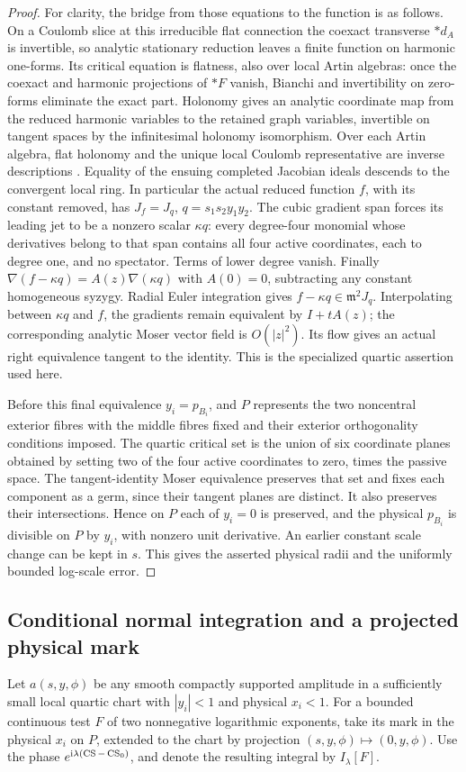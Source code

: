 \begin{proof}
For clarity, the bridge from those equations to the function is as follows. On a Coulomb slice at this irreducible flat connection the coexact transverse \(*d_A\) is invertible, so analytic stationary reduction leaves a finite function on harmonic one-forms. Its critical equation is flatness, also over local Artin algebras: once the coexact and harmonic projections of \(*F\) vanish, Bianchi and invertibility on zero-forms eliminate the exact part. Holonomy gives an analytic coordinate map from the reduced harmonic variables to the retained graph variables, invertible on tangent spaces by the infinitesimal holonomy isomorphism. Over each Artin algebra, flat holonomy and the unique local Coulomb representative are inverse descriptions \cite[\S6]{GM}. Equality of the ensuing completed Jacobian ideals descends to the convergent local ring. In particular the actual reduced function \(f\), with its constant removed, has \(J_f=J_q\), \(q=s_1s_2y_1y_2\). The cubic gradient span forces its leading jet to be a nonzero scalar \(\kappa q\): every degree-four monomial whose derivatives belong to that span contains all four active coordinates, each to degree one, and no spectator. Terms of lower degree vanish. Finally \(\nabla(f-\kappa q)=A(z)\nabla(\kappa q)\) with \(A(0)=0\), subtracting any constant homogeneous syzygy. Radial Euler integration gives \(f-\kappa q\in\mathfrak m^2J_q\). Interpolating between \(\kappa q\) and \(f\), the gradients remain equivalent by \(I+tA(z)\); the corresponding analytic Moser vector field is \(O(|z|^2)\). Its flow gives an actual right equivalence tangent to the identity. This is the specialized quartic assertion used here.

Before this final equivalence \(y_i=p_{B_i}\), and \(P\) represents the two noncentral exterior fibres with the middle fibres fixed and their exterior orthogonality conditions imposed. The quartic critical set is the union of six coordinate planes obtained by setting two of the four active coordinates to zero, times the passive space. The tangent-identity Moser equivalence preserves that set and fixes each component as a germ, since their tangent planes are distinct. It also preserves their intersections. Hence on \(P\) each of \(y_i=0\) is preserved, and the physical \(p_{B_i}\) is divisible on \(P\) by \(y_i\), with nonzero unit derivative. An earlier constant scale change can be kept in \(s\). This gives the asserted physical radii and the uniformly bounded log-scale error.
\end{proof}

\subsection{Conditional normal integration and a projected physical mark}
Let \(a(s,y,\phi)\) be any smooth compactly supported amplitude in a sufficiently small local quartic chart with \(|y_i|<1\) and physical \(x_i<1\). For a bounded continuous test \(F\) of two nonnegative logarithmic exponents, take its mark in the physical \(x_i\) on \(P\), extended to the chart by projection \((s,y,\phi)\mapsto(0,y,\phi)\). Use the phase \(e^{\mathrm i\lambda(\operatorname{CS}-\operatorname{CS}_0)}\), and denote the resulting integral by \(I_\lambda[F]\).

